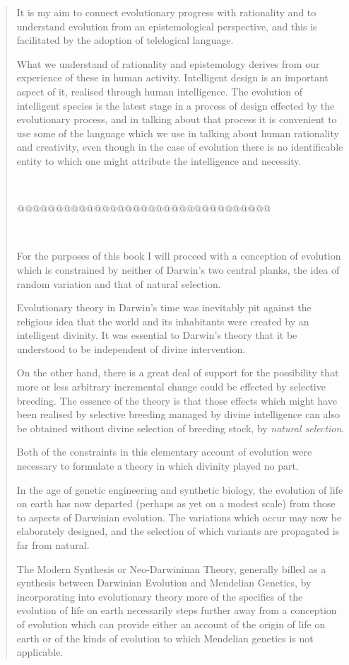 {\begin{quote}
It is my aim to connect evolutionary progress with rationality and to understand evolution from an epistemological perspective, and this is facilitated by the adoption of telelogical language.

What we understand of rationality and epistemology derives from our experience of these in human activity.
Intelligent design is an important aspect of it, realised through human intelligence.
The evolution of intelligent species is the latest stage in a process of design effected by the evolutionary process, and in talking about that process it is convenient to use some of the language which we use in talking about human rationality and creativity, even though in the case of evolution there is no identificable entity to which one might attribute the intelligence and necessity.

\ 

@@@@@@@@@@@@@@@@@@@@@@@@@@@@@@@@@

\


For the purposes of this book I will proceed with a conception of evolution which is constrained  by neither of Darwin's two central planks, the idea of random variation and that of natural selection.

Evolutionary theory in Darwin's time was inevitably pit against the religious idea that the world and its inhabitants were created by an intelligent divinity.
It was essential to Darwin's theory that it be understood to be independent of divine intervention.

On the other hand, there is a great deal of support for the possibility that more or less arbitrary incremental change could be effected by selective breeding.
The essence of the theory is that those effects which might have been realised by selective breeding managed by divine intelligence can also be obtained without divine selection of breeding stock, by \emph{natural selection}.

Both of the constraints in this elementary account of evolution were necessary to formulate a theory in which divinity played no part.

In the age of genetic engineering and synthetic biology, the evolution of life on earth has now departed (perhaps as yet on a modest scale) from those to aspects of Darwinian evolution.
The variations which occur may now be elaborately designed, and the selection of which variants are propagated is far from natural.

The Modern Synthesis or Neo-Darwininan Theory, generally billed as a synthesis between Darwinian Evolution and Mendelian Genetics, by incorporating into evolutionary theory more of the specifics of the evolution of life on earth necessarily steps further away from a conception of evolution which can provide either an account of the origin of life on earth or of the kinds of evolution to which Mendelian genetics is not applicable.


\end{quote}}

